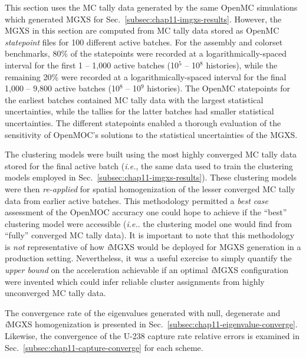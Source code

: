 This section uses the \ac{MC} tally data generated by the same OpenMC simulations which generated \ac{MGXS} for Sec.~\ref{subsec:chap11-imgxs-results}. However, the \ac{MGXS} in this section are computed from \ac{MC} tally data stored as OpenMC \textit{statepoint} files for 100 different active batches. For the assembly and colorset benchmarks, 80\% of the statepoints were recorded at a logarithmically-spaced interval for the first 1 -- 1,000 active batches (10$^{5}$ -- 10$^{8}$ histories), while the remaining 20\% were recorded at a logarithmically-spaced interval for the final 1,000 -- 9,800 active batches (10$^{8}$ -- 10$^{9}$ histories). The OpenMC statepoints for the earliest batches contained \ac{MC} tally data with the largest statistical uncertainties, while the tallies for the latter batches had smaller statistical uncertainties. The different statepoints enabled a thorough evaluation of the sensitivity of OpenMOC's solutions to the statistical uncertainties of the \ac{MGXS}.

The clustering models were built using the most highly converged \ac{MC} tally data stored for the final active batch (\textit{i.e.}, the same data used to train the clustering models employed in Sec.~\ref{subsec:chap11-imgxs-results}). These clustering models were then \textit{re-applied} for spatial homogenization of the lesser converged \ac{MC} tally data from earlier active batches. This methodology permitted a \textit{best case} assessment of the OpenMOC accuracy one could hope to achieve if the ``best'' clustering model were accessible (\textit{i.e.}. the clustering model one would find from ``fully'' converged \ac{MC} tally data). It is important to note that this methodology is \textit{not} representative of how \textit{i}\ac{MGXS} would be deployed for \ac{MGXS} generation in a production setting. Nevertheless, it was a useful exercise to simply quantify the \textit{upper bound} on the acceleration achievable if an optimal \textit{i}\ac{MGXS} configuration were invented which could infer reliable cluster assignments from highly unconverged \ac{MC} tally data.


The convergence rate of the eigenvalues generated with null, degenerate and \textit{i}\ac{MGXS} homogenization is presented in Sec.~\ref{subsec:chap11-eigenvalue-converge}. Likewise, the convergence of the U-238 capture rate relative errors is examined in Sec.~\ref{subsec:chap11-capture-converge} for each scheme.

